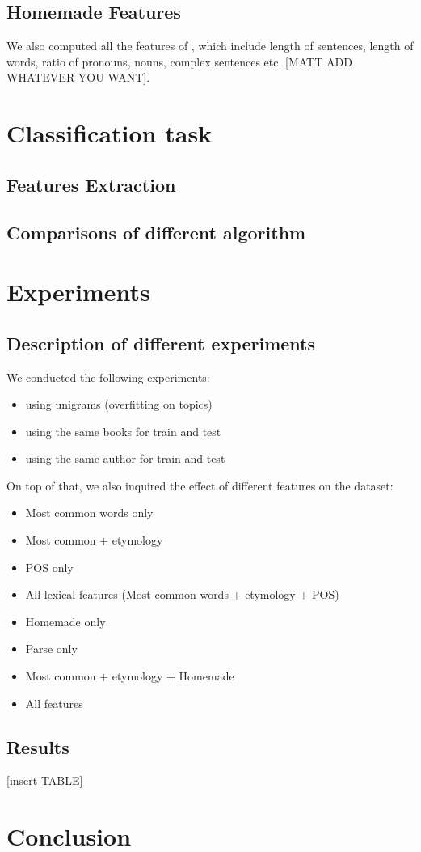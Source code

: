 \documentclass[10pt]{article}
\begin{document}
\subsection{Homemade Features}
We also computed all the features of \cite{homemade}, which include length of sentences, length of words, ratio of pronouns, nouns, complex sentences etc. [MATT ADD WHATEVER YOU WANT].

\section{Classification task}
\subsection{Features Extraction}
\subsection{Comparisons of different algorithm}

\section{Experiments}
\subsection{Description of different experiments}
We conducted the following experiments:
\begin{itemize}
\item using unigrams (overfitting on topics)
\item using the same books for train and test
\item using the same author for train and test
\end{itemize}

On top of that, we also inquired the effect of different features on the dataset:
\begin{itemize}
\item Most common words only
\item Most common + etymology
\item POS only
\item All lexical features (Most common words + etymology + POS)
\item Homemade only
\item Parse only
\item Most common + etymology + Homemade
\item All features
\end{itemize}

\subsection{Results}


[insert TABLE]
\section{Conclusion}



\end{document}
